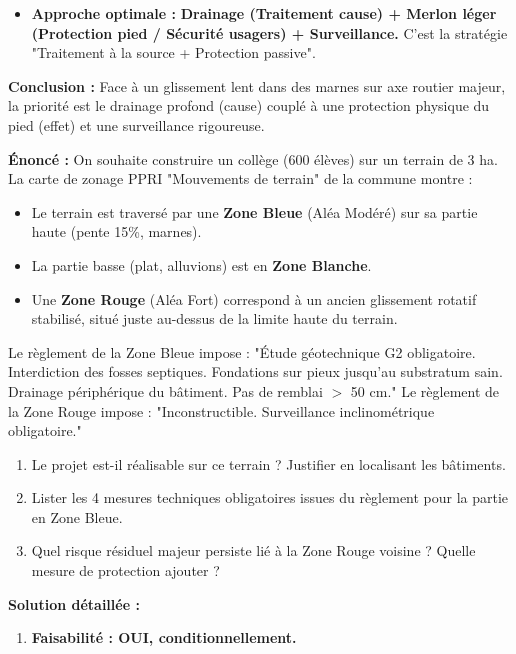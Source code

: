 \documentclass[11pt]{article}
\begin{document}
\begin{exoresolu}
\begin{enumerate}
\begin{itemize}
                \item \textbf{Approche optimale :} \textbf{Drainage (Traitement cause) + Merlon léger (Protection pied / Sécurité usagers) + Surveillance.} C'est la stratégie "Traitement à la source + Protection passive".
            \end{itemize}
    \end{enumerate}
    \textbf{Conclusion :} Face à un glissement lent dans des marnes sur axe routier majeur, la priorité est le drainage profond (cause) couplé à une protection physique du pied (effet) et une surveillance rigoureuse.
\end{exoresolu}

\begin{exoresolu}
    \textbf{Énoncé :} On souhaite construire un collège (600 élèves) sur un terrain de 3 ha. La carte de zonage PPRI "Mouvements de terrain" de la commune montre :
    \begin{itemize}
        \item Le terrain est traversé par une \textbf{Zone Bleue} (Aléa Modéré) sur sa partie haute (pente 15\%, marnes).
        \item La partie basse (plat, alluvions) est en \textbf{Zone Blanche}.
        \item Une \textbf{Zone Rouge} (Aléa Fort) correspond à un ancien glissement rotatif stabilisé, situé juste au-dessus de la limite haute du terrain.
    \end{itemize}
    Le règlement de la Zone Bleue impose : "Étude géotechnique G2 obligatoire. Interdiction des fosses septiques. Fondations sur pieux jusqu'au substratum sain. Drainage périphérique du bâtiment. Pas de remblai $>$ 50 cm."
    Le règlement de la Zone Rouge impose : "Inconstructible. Surveillance inclinométrique obligatoire."
    \begin{enumerate}
        \item Le projet est-il réalisable sur ce terrain ? Justifier en localisant les bâtiments.
        \item Lister les 4 mesures techniques obligatoires issues du règlement pour la partie en Zone Bleue.
        \item Quel risque résiduel majeur persiste lié à la Zone Rouge voisine ? Quelle mesure de protection ajouter ?
    \end{enumerate}
    \tcblower
    \textbf{Solution détaillée :}
    \begin{enumerate}
        \item \textbf{Faisabilité : OUI, conditionnellement.}

\end{enumerate}
\end{exoresolu}
\end{document}
